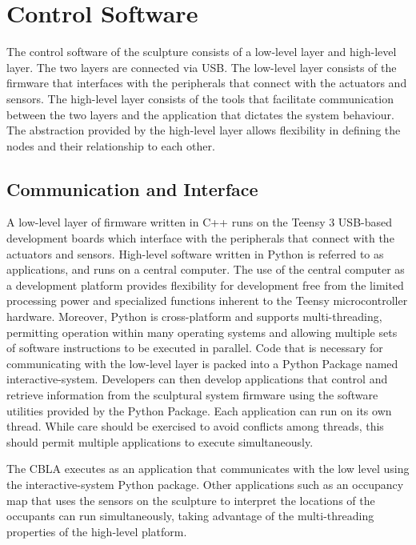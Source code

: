 \FloatBarrier
\section{Control Software}

The control software of the sculpture consists of a low-level layer and high-level layer. The two layers are connected via USB. The low-level layer consists of the firmware that interfaces with the peripherals that connect with the actuators and sensors. The high-level layer consists of the tools that facilitate communication between the two layers and the application that dictates the system behaviour. The abstraction provided by the high-level layer allows flexibility in defining the nodes and their relationship to each other. 

\subsection{Communication and Interface}

A low-level layer of firmware written in C++ runs on the Teensy 3 USB-based development boards which interface with the peripherals that connect with the actuators and sensors.  High-level software written in Python is referred to as applications, and runs on a central computer. The use of the central computer as a development platform provides flexibility for development free from the limited processing power and specialized functions inherent to the Teensy microcontroller hardware. Moreover, Python is cross-platform and supports multi-threading, permitting operation within many operating systems and allowing multiple sets of software instructions to be executed in parallel. Code that is necessary for communicating with the low-level layer is packed into a Python Package named interactive-system. Developers can then develop applications that control and retrieve information from the sculptural system firmware using the software utilities provided by the Python Package. Each application can run on its own thread. While care should be exercised to avoid conflicts among threads, this should permit multiple applications to execute simultaneously.	

The CBLA executes as an application that communicates with the low level using the interactive-system Python package. Other applications such as an occupancy map that uses the sensors on the sculpture to interpret the locations of the occupants can run simultaneously, taking advantage of the multi-threading properties of the high-level platform.

